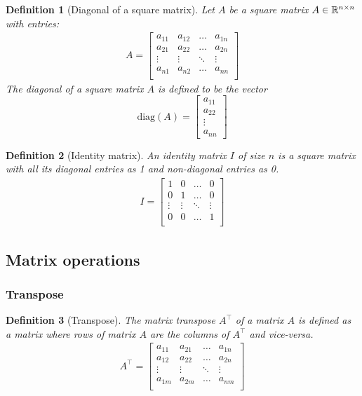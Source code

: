 \documentclass[twocolumn]{article}
\newtheorem{defn}{Definition}
\begin{document}
\begin{defn}[Diagonal of a square matrix]
  Let $A$ be a square matrix $A \in \mathbb{R}^{n \times n}$  with   entries:
  \begin{align}
    A  =  \begin{bmatrix}
      a_{11}  &  a_{12} &   \dots &  a_{1n} \\
      a_{21}  &  a_{22} &   \dots &  a_{2n} \\
      \vdots  & \vdots &   \ddots  &  \vdots   \\
      a_{n1}  &  a_{n2} &   \dots &  a_{nn} \\
    \end{bmatrix}
  \end{align}
  The diagonal of a square matrix  $A$ is defined  to be the vector
  \[  \text{diag}(A)= \begin{bmatrix} a_{11} \\   a_{22} \\ \vdots  \\ a_{nn} \end{bmatrix}\]
\end{defn}

\begin{defn}[Identity matrix]
  An identity matrix $I$ of size $n$ is  a square matrix with all its diagonal
  entries as 1 and non-diagonal entries as 0.
  \begin{align}
    I  =  \begin{bmatrix}
      1 & 0 & \dots & 0   \\
      0 & 1 & \dots & 0   \\
      \vdots   & \vdots &  \ddots  & \vdots \\
      0 & 0 & \dots & 1   \\
      \end{bmatrix}
    \end{align}
\end{defn}


\subsection{Matrix operations}
\subsubsection{Transpose}
\begin{defn}[Transpose]
  The matrix transpose $A^\top$ of a matrix $A$ is defined as a matrix where
  rows of matrix $A$ are the columns  of $A^\top$ and vice-versa.
  \begin{align}
    A^\top  =  \begin{bmatrix}
      a_{11}  &  a_{21} &   \dots &  a_{1n} \\
      a_{12}  &  a_{22} &   \dots &  a_{2n} \\
      \vdots  & \vdots &   \ddots  &  \vdots   \\
      a_{1m}  &  a_{2m} &   \dots &  a_{nm} \\
    \end{bmatrix}
  \end{align}
\end{defn}
\end{document}
